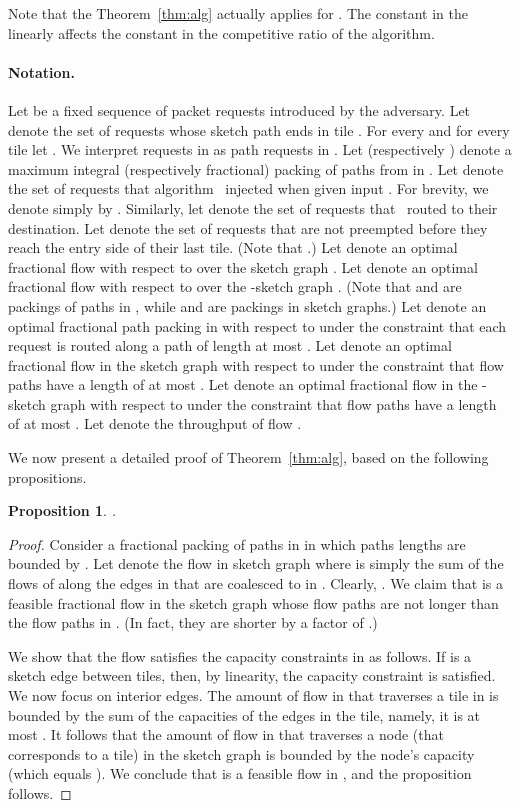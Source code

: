 \documentclass[11pt]{article}
\newtheorem{proposition}[theorem]{Proposition}
\newcommand{\route}{\text{\sc{ipp}}}
\newcommand{\IPP}{\route}
\newcommand{\alg}{\text{\sc{alg}}}
\newenvironment{proof sketch}[1]{\noindent {\emph{Proof sketch of #1:}}}{\hfill \qed}
\begin{document}
Note that the Theorem~\ref{thm:alg} actually applies for . The constant in the  linearly affects the constant in the competitive ratio of the algorithm.

\paragraph{Notation.}
Let  be a fixed sequence of packet requests introduced by the adversary.
Let  denote the set of requests whose sketch path ends in tile .
For every  and for every tile  let .
We interpret requests in  as path requests in .  Let  (respectively
) denote a maximum integral (respectively fractional) packing of paths from
 in .
Let  denote the set of requests that algorithm \IPP\ injected when
given input .  For brevity, we denote  simply by .
Similarly, let  denote the set of requests that \alg\ routed to their
destination.  Let  denote the set of requests that are not
preempted before they reach the entry side of their last tile.
(Note that .)
Let  denote an optimal fractional flow with respect to  over the sketch graph .
Let  denote an optimal fractional flow with respect to 
over the -sketch graph .
(Note that  and  are packings of paths in , while  and
 are packings in sketch graphs.)
Let  denote an  optimal fractional path packing in  with respect to  under the constraint that each request is routed along a path of length at most .
Let  denote an
optimal fractional flow in the sketch graph  with respect to
 under the constraint that flow paths have a length of at most .
Let  denote an
optimal fractional flow in the -sketch graph  with respect to
 under the constraint that flow paths have a length of at most .
Let  denote the throughput of flow .

\medskip
\noindent
We now present a detailed proof of Theorem~\ref{thm:alg}, based on the following propositions.
\begin{proposition}\label{prop:opt}
.
\end{proposition}
\begin{proof}
  Consider a fractional packing  of paths in  in which
  paths lengths are bounded by .  Let  denote the flow in
  sketch graph  where  is simply the sum of the flows of
   along the edges in  that are coalesced to  in
  . Clearly, . We claim that  is a feasible
  fractional flow in the sketch graph  whose flow paths are not
  longer than the flow paths in . (In fact, they are shorter by a factor of .)

  We show that the flow  satisfies the capacity constraints in 
  as follows. If  is a sketch edge between tiles, then, by
  linearity, the capacity constraint is satisfied.  We now focus on
  interior edges.  The amount of flow in  that traverses a tile in
   is bounded by the sum of the capacities of the
  edges in the tile, namely, it is at most . It
  follows that the amount of flow in  that traverses a node (that
  corresponds to a tile) in the sketch graph is bounded by the node's
  capacity (which equals ). We conclude that  is a feasible flow in , and the proposition follows.
\end{proof}
\end{document}
